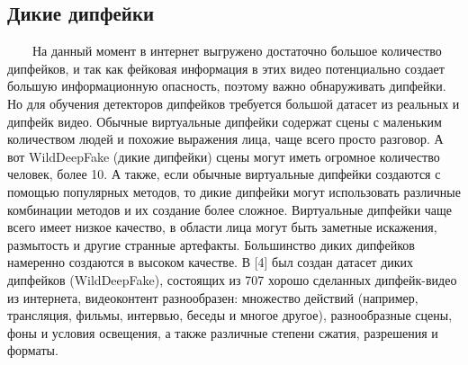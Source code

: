 \documentclass[12pt]{article}
\begin{document}
    \subsection{Дикие дипфейки}
        $\qquad$На данный момент в интернет выгружено достаточно большое количество дипфейков, и так как фейковая информация в этих видео потенциально создает большую информационную опасность, поэтому важно обнаруживать дипфейки. Но для обучения детекторов дипфейков требуется большой датасет из реальных и дипфейк видео. Обычные виртуальные дипфейки содержат сцены с маленьким количеством людей и похожие выражения лица, чаще всего просто разговор. А вот WildDeepFake (дикие дипфейки) сцены могут иметь огромное количество человек, более 10. А также, если обычные виртуальные дипфейки создаются с помощью популярных методов, то дикие дипфейки могут использовать различные комбинации методов и их создание более сложное. Виртуальные дипфейки чаще всего имеет низкое качество, в области лица могут быть заметные искажения, размытость и другие странные артефакты. Большинство диких дипфейков намеренно создаются в высоком качестве. В [4] был создан датасет диких дипфейков (WildDeepFake), состоящих из 707 хорошо сделанных дипфейк-видео из интернета, видеоконтент разнообразен: множество действий (например, трансляция, фильмы, интервью, беседы и многое другое), разнообразные сцены, фоны и условия освещения, а также различные степени сжатия, разрешения и форматы.
\end{document}
